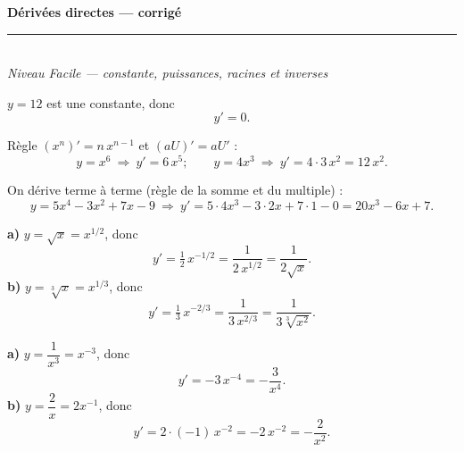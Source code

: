\pagestyle{fancy}\fancyhf{}
\fancyfoot[C]{\small\thepage}
\renewcommand{\headrulewidth}{0.8pt}



\begin{center}
{\LARGE\bfseries\color{primarydark} Dérivées directes --- corrigé}\\[2pt]
{\color{primary}\rule{0.5\textwidth}{1.2pt}}\\[4pt]
{\small\itshape Niveau Facile --- constante, puissances, racines et inverses}
\end{center}
\vspace{2mm}

\begin{corr}
$y=12$ est une constante, donc
\[
y'=0.
\]
\end{corr}

\begin{corr}
Règle $(x^{n})'=n\,x^{n-1}$ et $(aU)'=aU'$ :
\[
y=x^{6}\ \Rightarrow\ y'=6\,x^{5};\qquad
y=4x^{3}\ \Rightarrow\ y'=4\cdot 3\,x^{2}=12\,x^{2}.
\]
\end{corr}

\begin{corr}
On dérive terme à terme (règle de la somme et du multiple) :
\[
y=5x^{4}-3x^{2}+7x-9
\ \Rightarrow\
y'=5\cdot4x^{3}-3\cdot2x+7\cdot1-0=20x^{3}-6x+7.
\]
\end{corr}

\begin{corr}
\textbf{a)} $y=\sqrt{x}=x^{1/2}$, donc
\[
y'=\tfrac12\,x^{-1/2}=\frac{1}{2\,x^{1/2}}=\frac{1}{2\sqrt{x}}.
\]
\textbf{b)} $y=\sqrt[3]{x}=x^{1/3}$, donc
\[
y'=\tfrac13\,x^{-2/3}=\frac{1}{3\,x^{2/3}}=\frac{1}{3\sqrt[3]{x^{2}}}.
\]
\end{corr}

\begin{corr}
\textbf{a)} $y=\dfrac{1}{x^{3}}=x^{-3}$, donc
\[
y'=-3\,x^{-4}=-\frac{3}{x^{4}}.
\]
\textbf{b)} $y=\dfrac{2}{x}=2x^{-1}$, donc
\[
y'=2\cdot(-1)\,x^{-2}=-2\,x^{-2}=-\frac{2}{x^{2}}.
\]
\end{corr}


